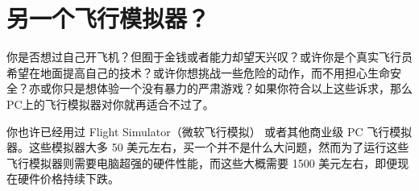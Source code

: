 \section{另一个飞行模拟器？}
\fi
\ifchinese
{}
\fi

\ifchinese
你是否想过自己开飞机？但囿于金钱或者能力却望天兴叹？或许你是个真实飞行员希望在地面提高自己的技术？或许你想挑战一些危险的动作，而不用担心生命安全？亦或你只是想体验一个没有暴力的严肃游戏？如果你符合以上这些诉求，那么PC上的飞行模拟器对你就再适合不过了。

你也许已经用过  Flight Simulator（微软飞行模拟） 或者其他商业级 PC 飞行模拟器。这些模拟器大多 50 美元左右，买一个并不是什么大问题，然而为了运行这些飞行模拟器则需要电脑超强的硬件性能，而这些大概需要 1500 美元左右，即便现在硬件价格持续下跌。

